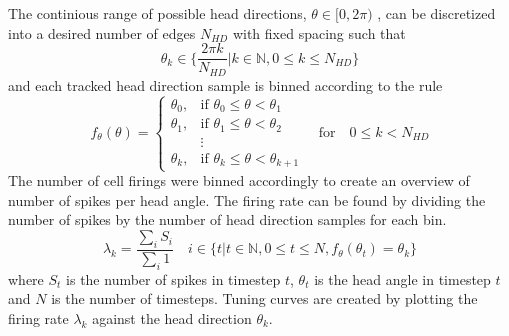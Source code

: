 The continious range of possible head directions, 
$\theta \in [0, 2\pi)$
, can be discretized into a desired number of edges $N_{HD}$ with fixed spacing such that
\begin{equation}
\theta_k \in \{\frac{2 \pi k}{N_{HD}}| k \in \mathbb{N}, 0 \leq k \leq N_{HD} \}
\end{equation}
and each tracked head direction sample is binned according to the rule
\begin{equation}
    f_{\theta}(\theta) =  \begin{cases}
        \theta_0, & \text{if } \theta_0 \leq \theta < \theta_{1} \\
        \theta_1, & \text{if } \theta_1 \leq \theta < \theta_{2} \\
         & \vdots \\
        \theta_k, & \text{if } \theta_k \leq \theta < \theta_{k+1}
    \end{cases} \quad \text{for} \quad 0 \leq k < N_{HD}
\end{equation}
The number of cell firings were binned accordingly to create an overview of number of spikes per head angle.
The firing rate can be found by dividing the number of spikes by the number of head direction samples for each bin.
\begin{equation}
    \lambda_k = \frac{\sum_i S_i}{\sum_i 1} \quad i \in \{t | t \in \mathbb{N}, 0 \leq t \leq N, f_\theta(\theta_t) = \theta_k\}
\end{equation}
where $S_t$ is the number of spikes in timestep $t$, $\theta_t$ is the head angle in timestep $t$ and $N$ is the number of timesteps. Tuning curves are created by plotting the firing rate $\lambda_k$ against the head direction $\theta_k$.

